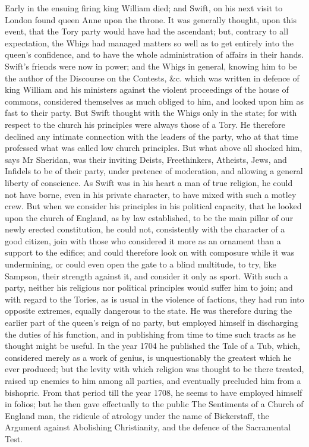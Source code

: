 \documentclass{article}
\begin{document}
Early in the ensuing firing king William died; and Swift, on his next visit to London found queen Anne upon the throne. It was generally thought, upon this event, that the Tory party would have had the ascendant; but, contrary to all expectation, the Whigs had managed matters so well as to get entirely into the queen's confidence, and to have the whole administration of affairs in their hands. Swift's friends were now in power; and the Whigs in general, knowing him to be the author of the Discourse on the Contests, \&c. which was written in defence of king William and his ministers against the violent proceedings of the house of commons, considered themselves as much obliged to him, and looked upon him as fast to their party. But Swift thought with the Whigs only in the state; for with respect to the church his principles were always those of a Tory. He therefore declined any intimate connection with the leaders of the party, who at that time professed what was called low church principles. But what above all shocked him, says Mr Sheridan, was their inviting Deists, Freethinkers, Atheists, Jews, and Infidels to be of their party, under pretence of moderation, and allowing a general liberty of conscience. As Swift was in his heart a man of true religion, he could not have borne, even in his private character, to have mixed with such a motley crew. But when we consider his principles in his political capacity, that he looked upon the church of England, as by law established, to be the main pillar of our newly erected constitution, he could not, consistently with the character of a good citizen, join with those who considered it more as an ornament than a support to the edifice; and could therefore look on with composure while it was undermining, or could even open the gate to a blind multitude, to try, like Sampson, their strength against it, and consider it only as sport. With such a party, neither his religious nor political principles would suffer him to join; and with regard to the Tories, as is usual in the violence of factions, they had run into opposite extremes, equally dangerous to the state. He was therefore during the earlier part of the queen's reign of no party, but employed himself in discharging the duties of his function, and in publishing from time to time such tracts as he thought might be useful. In the year 1704 he published the Tale of a Tub, which, considered merely as a work of genius, is unquestionably the greatest which he ever produced; but the levity with which religion was thought to be there treated, raised up enemies to him among all parties, and eventually precluded him from a bishopric. From that period till the year 1708, he seems to have employed himself in folios; but he then gave effectually to the public The Sentiments of a Church of England man, the ridicule of atrology under the name of Bickerstaff, the Argument against Abolishing Christianity, and the defence of the Sacramental Test.
\end{document}
